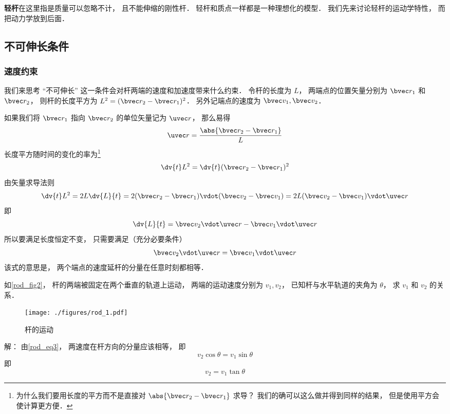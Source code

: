 

\textbf{轻杆}在这里指是质量可以忽略不计， 且不能伸缩的刚性杆． 轻杆和质点一样都是一种理想化的模型． 我们先来讨论轻杆的运动学特性， 而把动力学放到后面．

\subsection{不可伸长条件}
\subsubsection{速度约束}
我们来思考 “不可伸长” 这一条件会对杆两端的速度和加速度带来什么约束． 令杆的长度为 $L$， 两端点的位置矢量分别为 $\bvec r_1$ 和 $\bvec r_2$， 则杆的长度平方为 $L^2 = (\bvec r_2 - \bvec r_1)^2$． 另外记端点的速度为 $\bvec v_1, \bvec v_2$．

如果我们将 $\bvec r_1$ 指向 $\bvec r_2$ 的单位矢量记为 $\uvec r$， 那么易得
\begin{equation}\label{rod_eq7}
\uvec r = \frac{\abs{\bvec r_2 - \bvec r_1}}{L}
\end{equation}
长度平方随时间的变化的率为\footnote{为什么我们要用长度的平方而不是直接对 $\abs{\bvec r_2 - \bvec r_1}$ 求导？ 我们的确可以这么做并得到同样的结果， 但是使用平方会使计算更方便．}
\begin{equation}\label{rod_eq2}
\dv{t} L^2 = \dv{t} (\bvec r_2 - \bvec r_1)^2
\end{equation}
由矢量求导法则
\begin{equation}\label{rod_eq1}
\dv{t} L^2 = 2L \dv{L}{t} = 2 (\bvec r_2 - \bvec r_1) \vdot (\bvec v_2 - \bvec v_1) = 2L (\bvec v_2 - \bvec v_1) \vdot \uvec r
\end{equation}
即
\begin{equation}\label{rod_eq6}
\dv{L}{t} = \bvec v_2 \vdot \uvec r - \bvec v_1 \vdot \uvec r
\end{equation}
所以要满足长度恒定不变， 只需要满足（充分必要条件）
\begin{equation}\label{rod_eq3}
\bvec v_2 \vdot \uvec r = \bvec v_1 \vdot \uvec r
\end{equation}
该式的意思是， 两个端点的速度延杆的分量在任意时刻都相等．

\begin{example}{}\label{rod_ex1}
如\autoref{rod_fig2}， 杆的两端被固定在两个垂直的轨道上运动， 两端的运动速度分别为 $v_1, v_2$， 已知杆与水平轨道的夹角为 $\theta$， 求 $v_1$ 和 $v_2$ 的关系．
\begin{figure}[ht]
\centering
\texttt{[image: ./figures/rod\_1.pdf]}
\caption{杆的运动} \label{rod_fig1}
\end{figure}
解： 由\autoref{rod_eq3}， 两速度在杆方向的分量应该相等， 即
\begin{equation}
v_2 \cos\theta = v_1 \sin\theta
\end{equation}
即
\begin{equation}
v_2 = v_1 \tan\theta
\end{equation}
\end{example}

